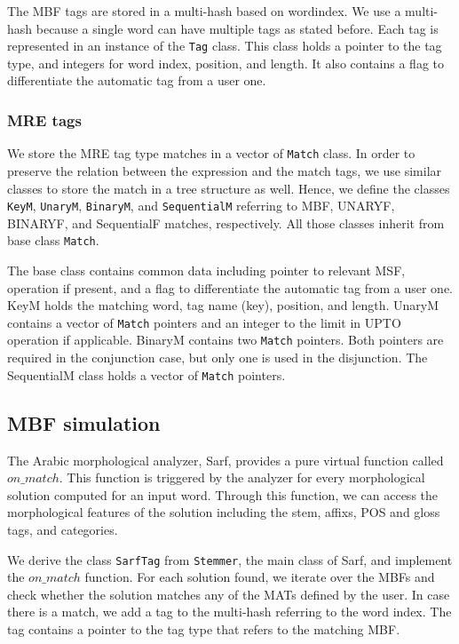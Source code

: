 The MBF tags are stored in a multi-hash based on wordindex. 
We use a multi-hash because a single word can have multiple tags as stated before. 
Each tag is represented in an instance of the {\tt Tag} class. 
This class holds a pointer to the tag type, and integers for word index, position, and length. 
It also contains a flag to differentiate the automatic tag from a user one.

\subsubsection{MRE tags}
\label{subsubsec:mretag}

We store the MRE tag type matches in a vector of {\tt Match} class. 
In order to preserve the relation between the expression and the match tags, we use similar classes to store the match in a tree structure as well. 
Hence, we define the classes {\tt KeyM}, {\tt UnaryM}, {\tt BinaryM}, and {\tt SequentialM} referring to MBF, UNARYF, BINARYF, and SequentialF matches, respectively. 
All those classes inherit from base class {\tt Match}.

The base class contains common data including pointer to relevant MSF, 
operation if present, and a flag to differentiate the automatic tag from a user one. 
KeyM holds the matching word, tag name (key), position, and length. 
UnaryM contains a vector of {\tt Match} pointers and an integer to the limit in UPTO operation if applicable. 
BinaryM contains two {\tt Match} pointers. 
Both pointers are required in the conjunction case, but only one is used in the disjunction. 
The SequentialM class holds a vector of {\tt Match} pointers.

\subsection{MBF simulation}

The Arabic morphological analyzer, Sarf, provides a pure virtual function called $on\_match$. 
This function is triggered by the analyzer for every morphological solution computed for an input word. 
Through this function, we can access the morphological features of the solution including the stem, affixs, POS and gloss tags, and categories.

We derive the class {\tt SarfTag} from {\tt Stemmer}, the main class of Sarf, and implement the $on\_match$ function. 
For each solution found, we iterate over the MBFs and check whether the solution matches any of the MATs defined by the user. 
In case there is a match, we add a tag to the multi-hash referring to the word index. 
The tag contains a pointer to the tag type that refers to the matching MBF. 

